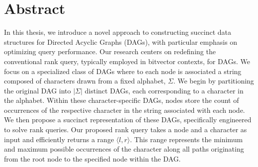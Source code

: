 


\begingroup
\let\clearpage\relax
\let\cleardoublepage\relax
\let\cleardoublepage\relax

\chapter*{Abstract}
In this thesis, we introduce a novel approach to constructing succinct data structures for Directed Acyclic Graphs (DAGs), with particular emphasis on optimizing query performance. Our research centers on redefining the conventional rank query, typically employed in bitvector contexts, for DAGs. We focus on a specialized class of DAGs where to each node is associated a string composed of characters drawn from a fixed alphabet, $\Sigma$. We begin by partitioning the original DAG into $|\Sigma|$ distinct DAGs, each corresponding to a character in the alphabet. Within these character-specific DAGs, nodes store the count of occurrences of the respective character in the string associated with each node. We then propose a succinct representation of these DAGs, specifically engineered to solve rank queries. Our proposed rank query takes a node and a character as input and efficiently returns a range $\langle l, r \rangle$. This range represents the minimum and maximum possible occurrences of the character along all paths originating from the root node to the specified node within the DAG.
\endgroup

\vfill
